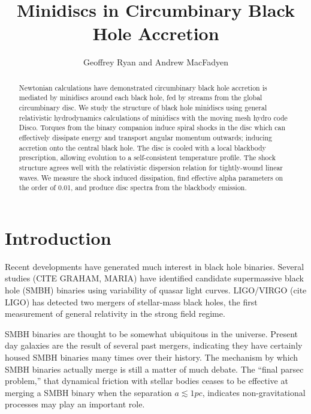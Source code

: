 \documentclass{emulateapj}
\begin{document}
\title{Minidiscs in Circumbinary Black Hole Accretion}
\author{Geoffrey Ryan and Andrew MacFadyen}

\begin{abstract}

Newtonian calculations have demonstrated circumbinary black hole accretion is mediated by minidiscs around each black hole, fed by streams from the global circumbinary disc. We study the structure of black hole minidiscs using general relativistic hydrodynamics calculations of minidiscs with the moving mesh hydro code Disco. Torques from the binary companion induce spiral shocks in the disc which can effectively dissipate energy and transport angular momentum outwards; inducing accretion onto the central black hole. The disc is cooled with a local blackbody prescription, allowing evolution to a self-consistent temperature profile.  The shock structure agrees well with the relativistic dispersion relation for tightly-wound linear waves. We measure the shock induced dissipation, find effective alpha parameters on the order of 0.01, and produce disc spectra from the blackbody emission.

\end{abstract}



\section{Introduction}
\label{sec:intro}

Recent developments have generated much interest in black hole binaries.  Several studies (CITE GRAHAM, MARIA) have identified candidate supermassive black hole (SMBH) binaries using variability of quasar light curves.  LIGO/VIRGO (cite LIGO) has detected two mergers of stellar-mass black holes, the first measurement of general relativity in the strong field regime.

SMBH binaries are thought to be somewhat ubiquitous in the universe.  Present day galaxies are the result of several past mergers, indicating they have certainly housed SMBH binaries many times over their history. The mechanism by which SMBH binaries actually merge is still a matter of much debate. The ``final parsec problem,'' that dynamical friction with stellar bodies ceases to be effective at merging a SMBH binary when the separation $a \lesssim 1pc$, indicates non-gravitational processes may play an important role.
\end{document}
